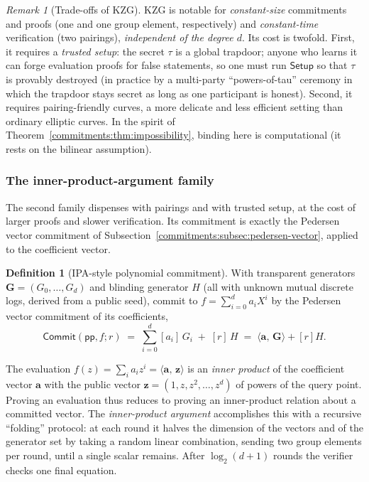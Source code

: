 \documentclass[11pt,a4paper]{article}
\theoremstyle{definition}
\newtheorem{definition}[theorem]{Definition}
\theoremstyle{remark}
\newtheorem{remark}[theorem]{Remark}
\newcommand{\ip}[2]{\langle #1,\, #2 \rangle}
\begin{document}
\begin{remark}[Trade-offs of KZG]\label{commitments:rem:kzg-tradeoffs}
KZG is notable for \emph{constant-size} commitments and proofs (one and one group element, respectively) and \emph{constant-time} verification (two pairings), \emph{independent of the degree \(d\)}. Its cost is twofold. First, it requires a \emph{trusted setup}: the secret \(\tau\) is a global trapdoor; anyone who learns it can forge evaluation proofs for false statements, so one must run \(\mathsf{Setup}\) so that \(\tau\) is provably destroyed (in practice by a multi-party ``powers-of-tau'' ceremony in which the trapdoor stays secret as long as one participant is honest). Second, it requires pairing-friendly curves, a more delicate and less efficient setting than ordinary elliptic curves. In the spirit of Theorem~\ref{commitments:thm:impossibility}, binding here is computational (it rests on the bilinear assumption).
\end{remark}

\subsubsection*{The inner-product-argument family}

The second family dispenses with pairings and with trusted setup, at the cost of larger proofs and slower verification. Its commitment is exactly the Pedersen vector commitment of Subsection~\ref{commitments:subsec:pedersen-vector}, applied to the coefficient vector.

\begin{definition}[IPA-style polynomial commitment]\label{commitments:def:ipa}
With transparent generators \(\mathbf{G} = (G_0, \dots, G_d)\) and blinding generator \(H\) (all with unknown mutual discrete logs, derived from a public seed), commit to \(f = \sum_{i=0}^d a_i X^i\) by the Pedersen vector commitment of its coefficients,
\[
  \mathsf{Commit}(\mathsf{pp}, f; r) \;=\; \sum_{i=0}^{d} [a_i]\,G_i \;+\; [r]\,H \;=\; \ip{\mathbf{a}}{\mathbf{G}} + [r]H.
\]
\end{definition}

The evaluation \(f(z) = \sum_i a_i z^i = \ip{\mathbf{a}}{\mathbf{z}}\) is an \emph{inner product} of the coefficient vector \(\mathbf{a}\) with the public vector \(\mathbf{z} = (1, z, z^2, \dots, z^d)\) of powers of the query point. Proving an evaluation thus reduces to proving an inner-product relation about a committed vector. The \emph{inner-product argument} accomplishes this with a recursive ``folding'' protocol: at each round it halves the dimension of the vectors and of the generator set by taking a random linear combination, sending two group elements per round, until a single scalar remains. After \(\log_2(d+1)\) rounds the verifier checks one final equation.
\end{document}
